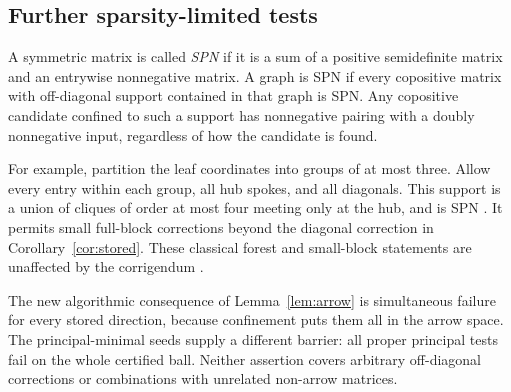 \subsection{Further sparsity-limited tests}
A symmetric matrix is called \emph{SPN} if it is a sum of a positive semidefinite matrix and an entrywise nonnegative matrix. A graph is SPN if every copositive matrix with off-diagonal support contained in that graph is SPN. Any copositive candidate confined to such a support has nonnegative pairing with a doubly nonnegative input, regardless of how the candidate is found.

For example, partition the leaf coordinates into groups of at most three. Allow every entry within each group, all hub spokes, and all diagonals. This support is a union of cliques of order at most four meeting only at the hub, and is SPN \cite[Corollaries~4.4 and~5.3]{SPN}. It permits small full-block corrections beyond the diagonal correction in Corollary~\ref{cor:stored}. These classical forest and small-block statements are unaffected by the corrigendum \cite{SPNcorr}.

The new algorithmic consequence of Lemma~\ref{lem:arrow} is simultaneous failure for every stored direction, because confinement puts them all in the arrow space. The principal-minimal seeds supply a different barrier: all proper principal tests fail on the whole certified ball. Neither assertion covers arbitrary off-diagonal corrections or combinations with unrelated non-arrow matrices.
